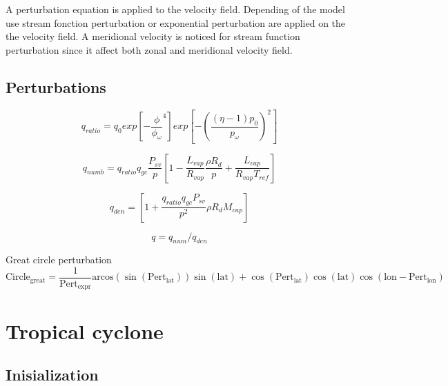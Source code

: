 \documentclass{article}
\begin{document}
A perturbation equation is applied to the velocity field. Depending of the model use stream fonction perturbation or exponential perturbation are applied on the the velocity field. A meridional velocity is noticed for stream function perturbation since it affect both zonal and meridional velocity field.













 
\subsection{Perturbations}


\begin{equation}
 q_{ratio}=q_0exp \left[-\frac{\phi}{\phi_{\omega}}^4 \right]exp \left[- \left(\frac{(\eta-1)p_0}{p_{\omega}} \right)^2\right]
\end{equation}

\begin{equation}
 q_{numb}=q_{ratio}q_{gc}\frac{P_{sv}}{p}\left[1-\frac{L_{vap}}{R_{vap}}\frac{\rho R_d}{p} + \frac{L_{vap}}{R_{vap} T_{ref}} \right]
\end{equation}

\begin{equation}
 q_{den}=\left[1+\frac{q_{ratio}q_{gc}P_{sv}}{p^2}\rho R_d M_{vap} \right]
\end{equation}

\begin{equation}
 q=q_{num}/q_{den}
\end{equation}

Great circle perturbation \\
\begin{equation*}
\text{Circle}_{\text{great}}=\frac{1}{\text{Pert}_{\text{expr}}}\text{arcos}(\sin(\text{Pert}_{\text{lat}}))\sin(\text{lat})+\cos(\text{Pert}_{\text{lat}})\cos(\text{lat})\cos(\text{lon}-\text{Pert}_{\text{lon}})
\end{equation*}




\clearpage 

\section{Tropical cyclone}

\subsection{ Inisialization }
\end{document}
